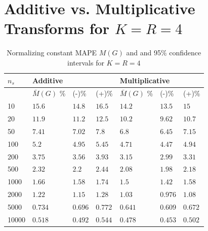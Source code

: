 \newpage

\section{Additive vs. Multiplicative Transforms for \(K=R=4\)}

\begin{table}[H]
\begin{center}
    \begin{tabular}{@{}lllllll@{}}
    \toprule
     \(n_s\) & \multicolumn{3}{l}{Additive} & \multicolumn{3}{l}{Multiplicative} \\ \midrule
        & \(\bar{M}(G)\) \% & (-)\% & (+)\% & \(\bar{M}(G)\) \% & (-)\% & (+)\%  \\ \midrule
        10 &\(15.6\) & \(14.8\) & \(16.5\) & \(14.2\) & \(13.5\) & \(15\)  \\ 
        20 &\(11.9\) & \(11.2\) & \(12.5\) & \(10.2\) & \(9.62\) & \(10.7\)  \\ 
        50 &\(7.41\) & \(7.02\) & \(7.8\) & \(6.8\) & \(6.45\) & \(7.15\)  \\ 
        100 &\(5.2\) & \(4.95\) & \(5.45\) & \(4.71\) & \(4.47\) & \(4.94\)  \\ 
        200 &\(3.75\) & \(3.56\) & \(3.93\) & \(3.15\) & \(2.99\) & \(3.31\)  \\ 
        500 &\(2.32\) & \(2.2\) & \(2.44\) & \(2.08\) & \(1.98\) & \(2.18\)  \\ 
        1000 &\(1.66\) & \(1.58\) & \(1.74\) & \(1.5\) & \(1.42\) & \(1.58\)  \\ 
        2000 &\(1.22\) & \(1.15\) & \(1.28\) & \(1.03\) & \(0.976\) & \(1.08\)  \\ 
        5000 &\(0.734\) & \(0.696\) & \(0.772\) & \(0.641\) & \(0.609\) & \(0.672\)  \\ 
        10000 &\(0.518\) & \(0.492\) & \(0.544\) & \(0.478\) & \(0.453\) & \(0.502\)  \\   \bottomrule
    \end{tabular}
\end{center}
\caption{Normalizing constant MAPE \(M(G)\) and and 95\(\%\) confidence intervals for \(K=R=4\)}
\label{tab:NC_MAPE_transforms_KR4}
\end{table}


